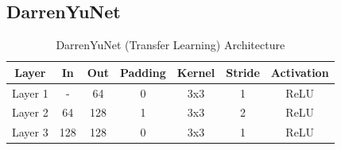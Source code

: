 \subsection*{DarrenYuNet}
\begin{table}[htbp]
	\centering
	\label{tab:darren}
	\setlength{\abovecaptionskip}{10pt}
	\begin{tabular}{|c|c|c|c|c|c|c|}
		\hline
		\textbf{Layer} & \textbf{In} & \textbf{Out} & \textbf{Padding} & \textbf{Kernel} & \textbf{Stride} & \textbf{Activation} \\ \hline
		Layer 1        & -           & 64           & 0                & 3x3             & 1               & ReLU                \\ \hline
		Layer 2        & 64          & 128          & 1                & 3x3             & 2               & ReLU                \\ \hline
		Layer 3        & 128         & 128          & 0                & 3x3             & 1               & ReLU                \\ \hline
	\end{tabular}
	\caption{DarrenYuNet (Transfer Learning) Architecture}
\end{table}


